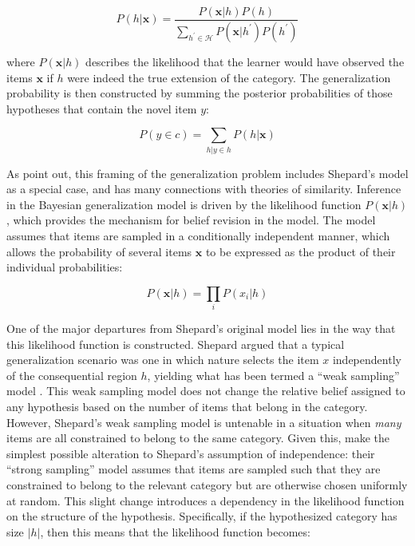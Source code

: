 \documentclass[doc,apacite]{apa6}
\begin{document}
\begin{equation}
\label{tg1}
P(h | \bm{x}) = \frac{P(\bm{x} | h) P(h)}{\sum_{h^\prime \in \mathcal{H}} P(\bm{x} | h^\prime) P(h^\prime)}
\end{equation}

\noindent
where $P(\bm{x} | h)$ describes the likelihood that the learner would have observed the items $\bm{x}$ if $h$ were indeed the true extension of the category. The generalization probability is then constructed by summing the posterior probabilities of those hypotheses that contain the novel item $y$:

\begin{equation}
\label{tg2}
P(y \in c) = \sum_{h | y \in h} P(h | \bm{x})
\end{equation}

\noindent
As  point out, this framing of the generalization problem includes Shepard's model as a special case, and has many connections with theories of similarity. Inference in the Bayesian generalization model is driven by the likelihood function $P(\bm{x}|h)$, which provides the mechanism for belief revision in the model. The model assumes that items are sampled in a conditionally independent manner, which allows the probability of several items $\bm{x}$ to be expressed as the product of their individual probabilities:

\begin{equation}
\label{tg3}
P(\bm{x} | h) = \prod_{i} P(x_i | h)
\end{equation} 

One of the major departures from Shepard's original model lies in the way that this likelihood function is constructed. Shepard argued that a typical generalization scenario was one in which nature selects the item $x$ independently of the consequential region $h$, yielding what has been termed a ``weak sampling'' model \cite{tenenbaum1999bayesian}. This weak sampling model does not change the relative belief assigned to any hypothesis based on the number of items that belong in the category. However, Shepard's weak sampling model is untenable in a situation when {\it many} items are all constrained to belong to the same category. Given this,  make the simplest possible alteration to Shepard's assumption of independence: their ``strong sampling'' model assumes that items are sampled such that they are constrained to belong to the relevant category but are otherwise chosen uniformly at random. This slight change introduces a dependency in the likelihood function on the structure of the hypothesis. Specifically, if the hypothesized category has size $|h|$, then this means that the likelihood function becomes:
\end{document}
